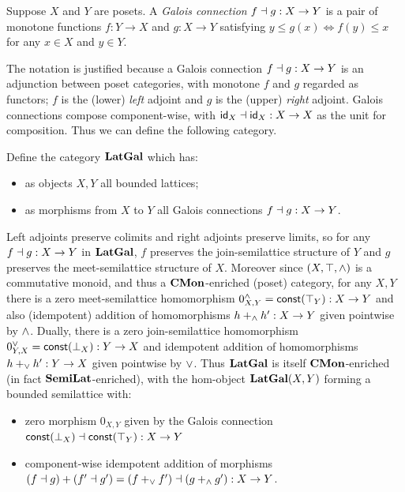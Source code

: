 \begin{definition}
Suppose $X$ and $Y$ are posets. A \emph{Galois connection} $f \dashv g: X \to Y$ is a pair of monotone
functions $f: Y \to X$ and $g: X \to Y$ satisfying $y \leq g(x) \iff f(y) \leq x$ for any $x \in X$ and $y \in
Y$.
\end{definition}

\noindent The notation is justified because a Galois connection $f \dashv g: X \to Y$ is an adjunction between
poset categories, with monotone $f$ and $g$ regarded as functors; $f$ is the (lower) \emph{left} adjoint and
$g$ is the (upper) \emph{right} adjoint. Galois connections compose component-wise, with $\mathsf{id}_X \dashv \mathsf{id}_X:
X \to X$ as the unit for composition. Thus we can define the following category.

\begin{definition}
Define the category $\mathbf{LatGal}$ which has:
\begin{itemize}
\item as objects $X, Y$ all bounded lattices;
\item as morphisms from $X$ to $Y$ all Galois connections $f \dashv g: X \to Y$.
\end{itemize}
\end{definition}

\noindent Left adjoints preserve colimits and right adjoints preserve limits, so for any $f \dashv g: X \to Y$
in $\mathbf{LatGal}$, $f$ preserves the join-semilattice structure of $Y$ and $g$ preserves the meet-semilattice
structure of $X$. Moreover since $(X, \top, \wedge)$ is a commutative monoid, and thus a $\mathbf{CMon}$-enriched
(poset) category, for any $X, Y$ there is a zero meet-semilattice homomorphism $0^{\wedge}_{X,Y} =
\mathsf{const}(\top_Y): X \to Y$ and also (idempotent) addition of homomorphisms $h +_{\wedge} h': X \to Y$ given
pointwise by $\wedge$. Dually, there is a zero join-semilattice homomorphism $0^{\vee}_{Y,X} =
\mathsf{const}(\bot_X): Y \to X$ and idempotent addition of homomorphisms $h +_{\vee} h': Y \to X$ given pointwise
by $\vee$. Thus $\mathbf{LatGal}$ is itself $\mathbf{CMon}$-enriched (in fact $\mathbf{SemiLat}$-enriched), with the hom-object
$\mathbf{LatGal}(X,Y)$ forming a bounded semilattice with:
\begin{itemize}
\item zero morphism $0_{X,Y}$ given by the Galois connection $\mathsf{const}(\bot_X) \dashv \mathsf{const}(\top_Y): X \to Y$
\item component-wise idempotent addition of morphisms $(f \dashv g) + (f' \dashv g') = (f +_{\vee} f') \dashv (g
+_{\wedge} g'): X \to Y$.
\end{itemize}

